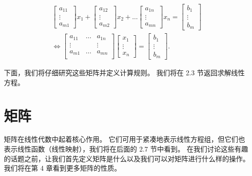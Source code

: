 \begin{align}
\begin{bmatrix}
    a_{11} \\ \vdots \\    a_{m1}
\end{bmatrix}
x_1 +
\begin{bmatrix}
    a_{12} \\ \vdots \\    a_{m2}
\end{bmatrix}
x_2 + \dots
\begin{bmatrix}
    a_{1n} \\ \vdots \\    a_{mn}
\end{bmatrix}
x_n =
\begin{bmatrix}
    b_1 \\ \vdots \\ b_m
\end{bmatrix}\\
\Longleftrightarrow
\begin{bmatrix}
    a_{11} & \dots & a_{1n} \\
    \vdots & &\vdots  \\
    a_{m1} & \dots & a_{mn} \\
\end{bmatrix}
\begin{bmatrix}
    x_1 \\ \vdots \\ x_n
\end{bmatrix}
=
\begin{bmatrix}
    b_1 \\ \vdots \\ b_m
\end{bmatrix}.
\end{align}

下面，我们将仔细研究这些矩阵并定义计算规则。
我们将在 2.3 节返回求解线性方程。

\section{矩阵}

矩阵在线性代数中起着核心作用。
它们可用于紧凑地表示线性方程组，但它们也表示线性函数（线性映射），我们将在后面的 2.7 节中看到。
在我们讨论这些有趣的话题之前，让我们首先定义矩阵是什么以及我们可以对矩阵进行什么样的操作。
我们将在第 4 章看到更多矩阵的性质。

